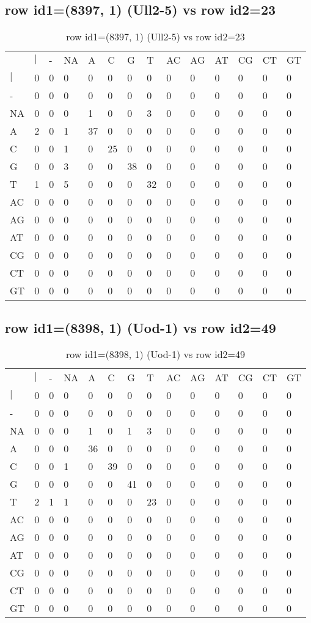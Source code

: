 \subsection{row id1=(8397, 1) (Ull2-5) vs row id2=23}
\begin{center}
\begin{longtable}{|l|l|l|l|l|l|l|l|l|l|l|l|l|l|}
\caption{row id1=(8397, 1) (Ull2-5) vs row id2=23} \label{table_dm454}\\
\hline
\\
\hline
&$|$&-&NA&A&C&G&T&AC&AG&AT&CG&CT&GT\\
$|$&0&0&0&0&0&0&0&0&0&0&0&0&0\\
-&0&0&0&0&0&0&0&0&0&0&0&0&0\\
NA&0&0&0&1&0&0&3&0&0&0&0&0&0\\
A&2&0&1&37&0&0&0&0&0&0&0&0&0\\
C&0&0&1&0&25&0&0&0&0&0&0&0&0\\
G&0&0&3&0&0&38&0&0&0&0&0&0&0\\
T&1&0&5&0&0&0&32&0&0&0&0&0&0\\
AC&0&0&0&0&0&0&0&0&0&0&0&0&0\\
AG&0&0&0&0&0&0&0&0&0&0&0&0&0\\
AT&0&0&0&0&0&0&0&0&0&0&0&0&0\\
CG&0&0&0&0&0&0&0&0&0&0&0&0&0\\
CT&0&0&0&0&0&0&0&0&0&0&0&0&0\\
GT&0&0&0&0&0&0&0&0&0&0&0&0&0\\
\hline
\end{longtable}
\end{center}

\subsection{row id1=(8398, 1) (Uod-1) vs row id2=49}
\begin{center}
\begin{longtable}{|l|l|l|l|l|l|l|l|l|l|l|l|l|l|}
\caption{row id1=(8398, 1) (Uod-1) vs row id2=49} \label{table_dm456}\\
\hline
\\
\hline
&$|$&-&NA&A&C&G&T&AC&AG&AT&CG&CT&GT\\
$|$&0&0&0&0&0&0&0&0&0&0&0&0&0\\
-&0&0&0&0&0&0&0&0&0&0&0&0&0\\
NA&0&0&0&1&0&1&3&0&0&0&0&0&0\\
A&0&0&0&36&0&0&0&0&0&0&0&0&0\\
C&0&0&1&0&39&0&0&0&0&0&0&0&0\\
G&0&0&0&0&0&41&0&0&0&0&0&0&0\\
T&2&1&1&0&0&0&23&0&0&0&0&0&0\\
AC&0&0&0&0&0&0&0&0&0&0&0&0&0\\
AG&0&0&0&0&0&0&0&0&0&0&0&0&0\\
AT&0&0&0&0&0&0&0&0&0&0&0&0&0\\
CG&0&0&0&0&0&0&0&0&0&0&0&0&0\\
CT&0&0&0&0&0&0&0&0&0&0&0&0&0\\
GT&0&0&0&0&0&0&0&0&0&0&0&0&0\\
\hline
\end{longtable}
\end{center}

